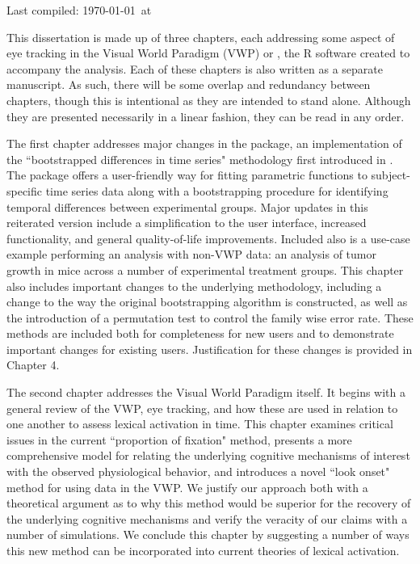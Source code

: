
Last compiled: \today \  at \currenttime

This dissertation is made up of three chapters, each addressing some aspect of eye tracking in the Visual World Paradigm (VWP) or , the R software created to accompany the analysis. Each of these chapters is also written as a separate manuscript. As such, there will be some overlap and redundancy between chapters, though this is intentional as they are intended to stand alone. Although they are presented necessarily in a linear fashion, they can be read in any order.

The first chapter addresses major changes in the  package, an implementation of the ``bootstrapped differences in time series" methodology first introduced in \citet{oleson2017detecting}. The package offers a user-friendly way for fitting parametric functions to subject-specific time series data along with a bootstrapping procedure for identifying temporal differences between experimental groups. Major updates in this reiterated version include a simplification to the user interface, increased functionality, and general quality-of-life improvements. Included also is a use-case example performing an analysis with non-VWP data: an analysis of tumor growth in mice across a number of experimental treatment groups. This chapter also includes important changes to the underlying methodology, including a change to the way the original bootstrapping algorithm is constructed, as well as the introduction of a permutation test to control the family wise error rate. These methods are included both for completeness for new users and to demonstrate important changes for existing users. Justification for these changes is provided in Chapter 4. 

The second chapter addresses the Visual World Paradigm itself. It begins with a general review of the VWP, eye tracking, and how these are used in relation to one another to assess lexical activation in time. This chapter examines critical issues in the current ``proportion of fixation" method, presents a more comprehensive model for relating the underlying cognitive mechanisms of interest with the observed physiological behavior, and introduces a novel ``look onset" method for using data in the VWP. We justify our approach both with a theoretical argument as to why this method would be superior for the recovery of the underlying cognitive mechanisms and verify the veracity of our claims with a number of simulations. We conclude this chapter by suggesting a number of ways this new method can be incorporated into current theories of lexical activation.

